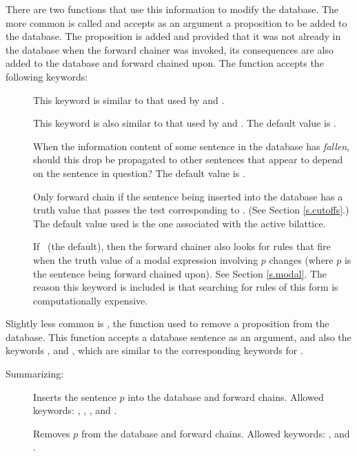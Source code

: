 There are two functions that use this information to modify the
database.  The more common is called  and accepts as an
argument a proposition to be added to the database.  The proposition
is added and provided that it was not already in the database when the
forward chainer was invoked, its consequences are also added to the
database and forward chained upon.  The  function accepts
the following keywords:
 \begin{description}
 \item [] This keyword is similar to that used by
 and .
 \item [] This keyword is also similar to that used
by  and .  The default value is \NIL.
 \item [] When the information content of some
sentence in the database has {\em fallen}, should this drop be
propagated to other sentences that appear to depend on the sentence
in question?  The default value is \T.
 \item [] Only forward chain if the sentence being
inserted into the database has a truth value that passes the test
corresponding to .  (See Section \ref{s.cutoffs}.)  The
default value used is the one associated with the active bilattice.
 \item [] If \T\ (the default), then the forward
chainer also looks for rules that fire when the truth value of a
modal expression involving $p$ changes (where $p$ is the sentence
being forward chained upon).  See Section \ref{s.modal}.  The reason
this keyword is included is that searching for rules of this form is
computationally expensive.
 \end{description}

Slightly less common is , the function used to remove a
proposition from the database.  This function accepts a database
sentence as an argument, and also the keywords ,
 and , which are similar to the
corresponding keywords for .

Summarizing:
 \begin{description}
 \item [] Inserts the sentence $p$ into the database and
forward chains.  Allowed keywords: , ,
,  and .
 \item [] Removes $p$ from the database and forward
chains.  Allowed keywords: ,  and
.
 \end{description}


